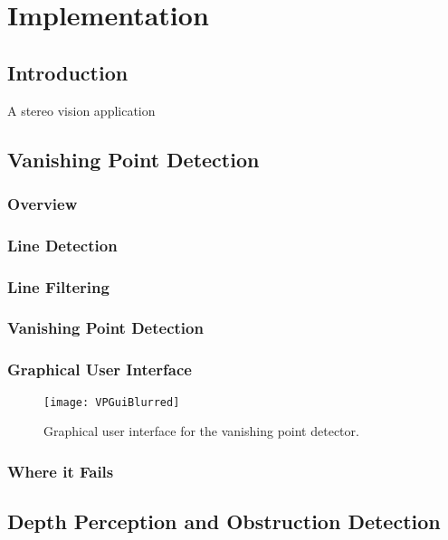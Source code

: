 \chapter{Implementation}
\label{chp:implementation}

\section{Introduction}

A stereo vision application 

\section{Vanishing Point Detection}

\subsection{Overview}

\subsection{Line Detection}

\subsection{Line Filtering}

\subsection{Vanishing Point Detection}

\subsection{Graphical User Interface}

\begin{figure}
	\texttt{[image: VPGuiBlurred]}
	\caption{Graphical user interface for the vanishing point detector.}
	\label{fig:vpGui}
\end{figure}

\subsection{Where it Fails}

\section{Depth Perception and Obstruction Detection}

